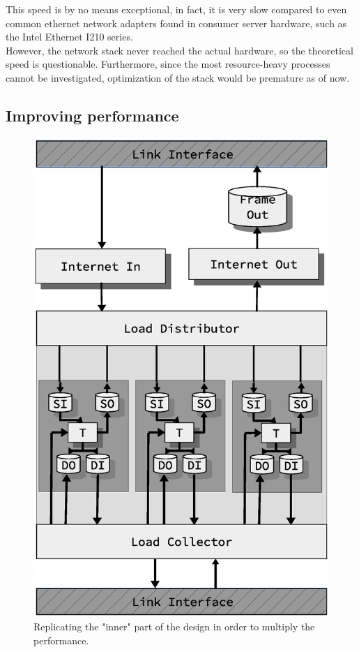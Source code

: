 This speed is by no means exceptional, in fact, it is very slow compared
to even common ethernet network adapters found in consumer server hardware, such
as the Intel Ethernet I210 series\cite{intel_1gbps_nic}.\\

However, the network stack never reached the actual hardware, so the
theoretical speed is questionable. Furthermore, since the most resource-heavy
processes cannot be investigated, optimization of the stack would be premature
as of now.




\subsection{Improving performance}


\begin{figure}
\centering
\includegraphics[scale=0.45]{discussion/design_stacked.eps}
\caption{Replicating the "inner" part of the design in order to multiply the
performance. }
\label{fig:design_stacked}
\end{figure}


